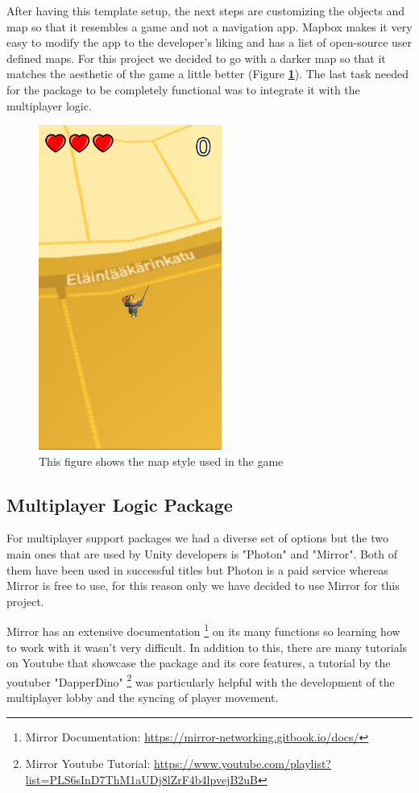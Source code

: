 \documentclass{dissertation}
\begin{document}
After having this template setup, the next steps are customizing the objects and map so that it resembles a game and not a navigation app. Mapbox makes it very easy to modify the app to the developer's liking and has a list of open-source user defined maps. For this project we decided to go with a darker map so that it matches the aesthetic of the game a little better (Figure \textbf{\ref{fig:dark-mapbox}}). The last task needed for the package to be completely functional was to integrate it with the multiplayer logic.

\begin{figure}[H]
\centering
\includegraphics[width = 6cm]{images/dark-mapbox.png}
\caption{This figure shows the map style used in the game}
\label{fig:dark-mapbox}
\end{figure}

\subsection{Multiplayer Logic Package}
For multiplayer support packages we had a diverse set of options but the two main ones that are used by Unity developers is "Photon" and "Mirror". Both of them have been used in successful titles but Photon is a paid service whereas Mirror is free to use, for this reason only we have decided to use Mirror for this project.

Mirror has an extensive documentation \footnote{Mirror Documentation: \url{https://mirror-networking.gitbook.io/docs/}} on its many functions so learning how to work with it wasn't very difficult. In addition to this, there are many tutorials on Youtube that showcase the package and its core features, a tutorial by the youtuber "DapperDino" \footnote{Mirror Youtube Tutorial: \url{https://www.youtube.com/playlist?list=PLS6sInD7ThM1aUDj8lZrF4b4lpvejB2uB}} was particularly helpful with the development of the multiplayer lobby and the syncing of player movement.
\end{document}
